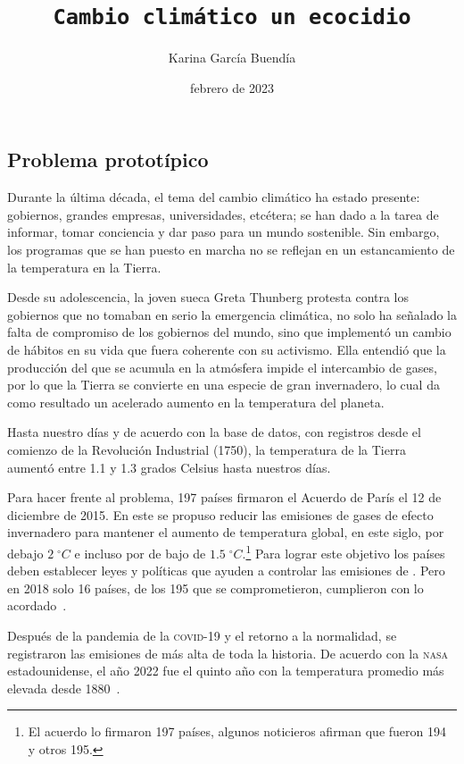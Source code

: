 \documentclass[article,11pt]{memoir}
\title{\texttt{Cambio climático un ecocidio}}
\author{Karina García Buendía}
\date{febrero de 2023}
\begin{document}
\maketitle
\subsection*{Problema prototípico}

Durante la última década, el tema del cambio climático ha estado presente: gobiernos, grandes empresas, universidades, etcétera; se han dado a la tarea de informar, tomar conciencia y dar paso para un mundo sostenible. Sin embargo, los programas que se han puesto en marcha no se reflejan en un estancamiento de la temperatura en la Tierra. 

Desde su adolescencia, la joven sueca Greta Thunberg protesta contra los gobiernos que no tomaban en serio la emergencia climática, no solo ha señalado la falta de compromiso de los gobiernos del mundo, sino que implementó un cambio de hábitos en su vida que fuera coherente con su activismo. Ella entendió que la producción del  que se acumula en la atmósfera impide el intercambio de gases, por lo que la Tierra se convierte en una especie de gran invernadero, lo cual da como resultado un acelerado aumento en la temperatura del planeta.

Hasta nuestro días y de acuerdo con la base de datos, con registros desde el comienzo de la Revolución Industrial (1750), la temperatura de la Tierra aumentó entre 1.1 y 1.3 grados Celsius hasta nuestros días.

Para hacer frente al problema, 197 países firmaron el Acuerdo de París el 12 de diciembre de 2015. En este se propuso reducir las emisiones de gases de efecto invernadero para mantener el aumento de temperatura global, en este siglo, por debajo \(2\;^\circ C\) e incluso por de bajo de \(1.5\;^\circ C\).\footnote{El acuerdo lo firmaron 197 países, algunos noticieros afirman que fueron 194 y otros 195.} Para lograr este objetivo los países deben establecer leyes y políticas que ayuden a controlar las emisiones de . Pero en 2018 solo 16 países, de los 195 que se comprometieron, cumplieron con lo acordado~\parencite{Jornada1}.

Después de la pandemia de la \textsc{covid}-19 y el retorno a la normalidad, se registraron las emisiones de  más alta de toda la historia. De acuerdo con la \textsc{nasa} estadounidense, el año 2022 fue el quinto año con la temperatura promedio más elevada desde 1880~\parencite{Promedio}.
\end{document}
